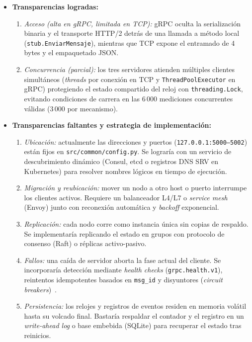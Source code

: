 \documentclass[12pt,a4paper]{article}
\begin{document}
\begin{itemize}
  \item \textbf{Transparencias logradas:}
    \begin{enumerate}
      \item \emph{Acceso (alta en gRPC, limitada en TCP):} gRPC oculta la serialización binaria y el transporte HTTP/2 detrás de una llamada a método local (\texttt{stub.EnviarMensaje}), mientras que TCP expone el entramado de 4 bytes y el empaquetado JSON.
      \item \emph{Concurrencia (parcial):} los tres servidores atienden múltiples clientes simultáneos (\emph{threads} por conexión en TCP y \texttt{ThreadPoolExecutor} en gRPC) protegiendo el estado compartido del reloj con \texttt{threading.Lock}, evitando condiciones de carrera en las 6\,000 mediciones concurrentes válidas (3\,000 por mecanismo).
    \end{enumerate}
  \item \textbf{Transparencias faltantes y estrategia de implementación:}
    \begin{enumerate}
      \item \emph{Ubicación:} actualmente las direcciones y puertos (\texttt{127.0.0.1:5000--5002}) están fijos en \texttt{src/common/config.py}. Se lograría con un servicio de descubrimiento dinámico (Consul, etcd o registros DNS SRV en Kubernetes) para resolver nombres lógicos en tiempo de ejecución.
      \item \emph{Migración y reubicación:} mover un nodo a otro host o puerto interrumpe los clientes activos. Requiere un balanceador L4/L7 o \emph{service mesh} (Envoy) junto con reconexión automática y \emph{backoff} exponencial.
      \item \emph{Replicación:} cada nodo corre como instancia única sin copias de respaldo. Se implementaría replicando el estado en grupos con protocolo de consenso (Raft) o réplicas activo-pasivo.
      \item \emph{Fallos:} una caída de servidor aborta la fase actual del cliente. Se incorporaría detección mediante \emph{health checks} (\texttt{grpc.health.v1}), reintentos idempotentes basados en \texttt{msg\_id} y disyuntores (\emph{circuit breakers})~\cite{mohammad2025resilient}.
      \item \emph{Persistencia:} los relojes y registros de eventos residen en memoria volátil hasta su volcado final. Bastaría respaldar el contador y el registro en un \emph{write-ahead log} o base embebida (SQLite) para recuperar el estado tras reinicios.
    \end{enumerate}
\end{itemize}
\end{document}
